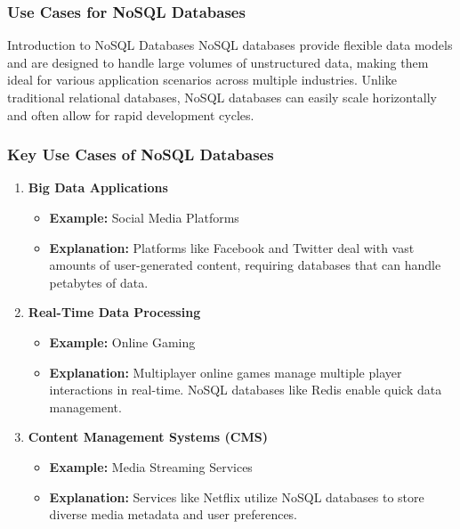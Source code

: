 \documentclass[aspectratio=169]{beamer}
\begin{document}
\begin{frame}[fragile]
    \frametitle{Use Cases for NoSQL Databases}
    \begin{block}{Introduction to NoSQL Databases}
        NoSQL databases provide flexible data models and are designed to handle large volumes of unstructured data, making them ideal for various application scenarios across multiple industries. Unlike traditional relational databases, NoSQL databases can easily scale horizontally and often allow for rapid development cycles.
    \end{block}
\end{frame}

\begin{frame}[fragile]
    \frametitle{Key Use Cases of NoSQL Databases}
    \begin{enumerate}
        \item \textbf{Big Data Applications}
        \begin{itemize}
            \item \textbf{Example:} Social Media Platforms
            \item \textbf{Explanation:} Platforms like Facebook and Twitter deal with vast amounts of user-generated content, requiring databases that can handle petabytes of data.
        \end{itemize}

        \item \textbf{Real-Time Data Processing}
        \begin{itemize}
            \item \textbf{Example:} Online Gaming
            \item \textbf{Explanation:} Multiplayer online games manage multiple player interactions in real-time. NoSQL databases like Redis enable quick data management.
        \end{itemize}

        \item \textbf{Content Management Systems (CMS)}
        \begin{itemize}
            \item \textbf{Example:} Media Streaming Services
            \item \textbf{Explanation:} Services like Netflix utilize NoSQL databases to store diverse media metadata and user preferences.
        \end{itemize}
    \end{enumerate}
\end{frame}
\end{document}
